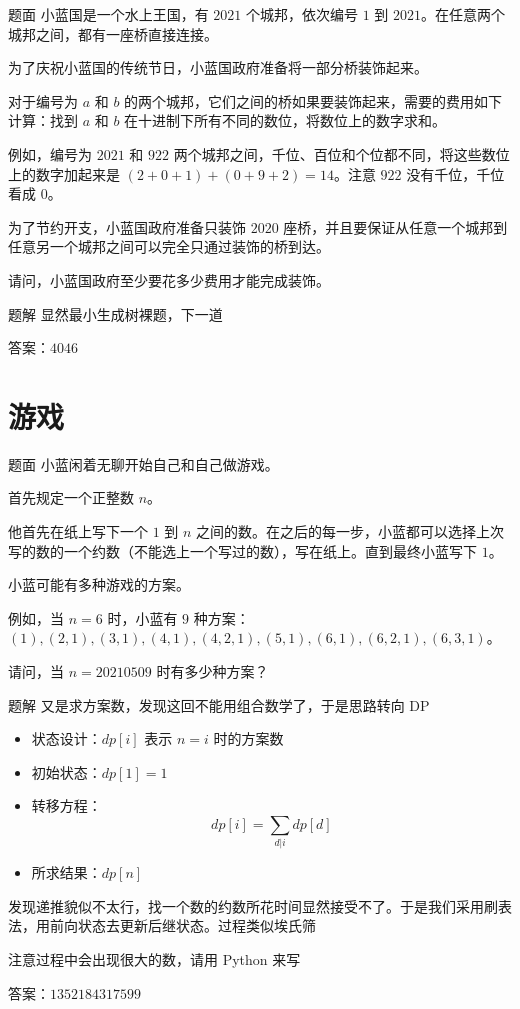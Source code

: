 \documentclass{pptt}
\begin{document}
\begin{frame}{题面}
    小蓝国是一个水上王国，有 $2021$ 个城邦，依次编号 $1$ 到 $2021$。在任意两个城邦之间，都有一座桥直接连接。

    为了庆祝小蓝国的传统节日，小蓝国政府准备将一部分桥装饰起来。

    对于编号为 $a$ 和 $b$ 的两个城邦，它们之间的桥如果要装饰起来，需要的费用如下计算：找到 $a$ 和 $b$ 在十进制下所有不同的数位，将数位上的数字求和。

    例如，编号为 $2021$ 和 $922$ 两个城邦之间，千位、百位和个位都不同，将这些数位上的数字加起来是 $(2+0+1)+(0+9+2)=14$。注意 $922$ 没有千位，千位看成 $0$。

    为了节约开支，小蓝国政府准备只装饰 $2020$ 座桥，并且要保证从任意一个城邦到任意另一个城邦之间可以完全只通过装饰的桥到达。

    请问，小蓝国政府至少要花多少费用才能完成装饰。
\end{frame}

\begin{frame}{题解}
    显然最小生成树裸题，下一道

    答案：$4046$
\end{frame}

\section{游戏}

\begin{frame}{题面}
    小蓝闲着无聊开始自己和自己做游戏。

    首先规定一个正整数 $n$。

    他首先在纸上写下一个 $1$ 到 $n$ 之间的数。在之后的每一步，小蓝都可以选择上次写的数的一个约数（不能选上一个写过的数），写在纸上。直到最终小蓝写下 $1$。

    小蓝可能有多种游戏的方案。

    例如，当 $n=6$ 时，小蓝有 $9$ 种方案：$(1), (2,1), (3,1), (4,1), (4,2,1), (5,1),(6,1), (6,2,1), (6,3,1)$。

    请问，当 $n=20210509$ 时有多少种方案？
\end{frame}

\begin{frame}{题解}
    又是求方案数，发现这回不能用组合数学了，于是思路转向 DP

    \begin{itemize}
        \item 状态设计：$dp[i]$ 表示 $n=i$ 时的方案数
        \item 初始状态：$dp[1] = 1$
        \item 转移方程：$$dp[i] = \sum_{d|i} dp[d]$$
        \item 所求结果：$dp[n]$
    \end{itemize}

    发现递推貌似不太行，找一个数的约数所花时间显然接受不了。于是我们采用刷表法，用前向状态去更新后继状态。过程类似埃氏筛

    注意过程中会出现很大的数，请用 Python 来写

    答案：$1352184317599$
\end{frame}
\end{document}
